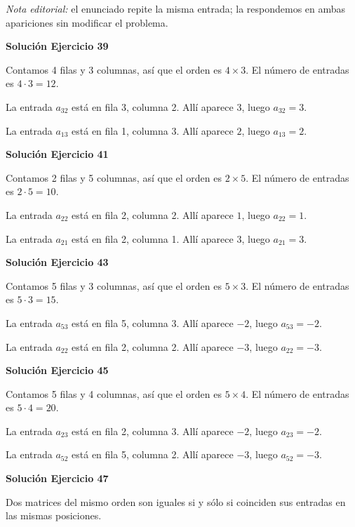 \documentclass[12pt]{article}
\theoremstyle{remark}
\begin{document}
\emph{Nota editorial:} el enunciado repite la misma entrada; la respondemos en ambas apariciones sin modificar el problema.


\par\bigskip\noindent\textbf{Solución Ejercicio 39}\par\nobreak
Contamos 4 filas y 3 columnas, así que el orden es $4\times3$. El número de entradas es $4\cdot 3=12$.

La entrada $a_{32}$ está en fila 3, columna 2. Allí aparece $3$, luego $\boxed{a_{32}=3}$.

La entrada $a_{13}$ está en fila 1, columna 3. Allí aparece $2$, luego $\boxed{a_{13}=2}$.


\par\bigskip\noindent\textbf{Solución Ejercicio 41}\par\nobreak
Contamos 2 filas y 5 columnas, así que el orden es $2\times5$. El número de entradas es $2\cdot 5=10$.

La entrada $a_{22}$ está en fila 2, columna 2. Allí aparece $1$, luego $\boxed{a_{22}=1}$.

La entrada $a_{21}$ está en fila 2, columna 1. Allí aparece $3$, luego $\boxed{a_{21}=3}$.


\par\bigskip\noindent\textbf{Solución Ejercicio 43}\par\nobreak
Contamos 5 filas y 3 columnas, así que el orden es $5\times3$. El número de entradas es $5\cdot 3=15$.

La entrada $a_{53}$ está en fila 5, columna 3. Allí aparece $-2$, luego $\boxed{a_{53}=-2}$.

La entrada $a_{22}$ está en fila 2, columna 2. Allí aparece $-3$, luego $\boxed{a_{22}=-3}$.


\par\bigskip\noindent\textbf{Solución Ejercicio 45}\par\nobreak
Contamos 5 filas y 4 columnas, así que el orden es $5\times4$. El número de entradas es $5\cdot 4=20$.

La entrada $a_{23}$ está en fila 2, columna 3. Allí aparece $-2$, luego $\boxed{a_{23}=-2}$.

La entrada $a_{52}$ está en fila 5, columna 2. Allí aparece $-3$, luego $\boxed{a_{52}=-3}$.


\par\bigskip\noindent\textbf{Solución Ejercicio 47}\par\nobreak
Dos matrices del mismo orden son iguales si y sólo si coinciden sus entradas en las mismas posiciones.
\end{document}
